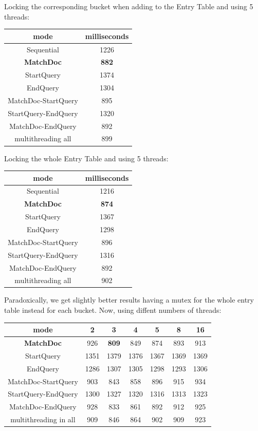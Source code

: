 \documentclass{article}
\begin{document}
Locking the corresponding bucket when adding to the Entry Table and using 5 threads:
\begin{center}
\begin{tabular}{||c c||} 
 \hline
 mode & milliseconds \\ 
 \hline\hline
 Sequential & 1226 \\
 \hline
 \textbf{MatchDoc} & \textbf{882} \\
 \hline
 StartQuery & 1374 \\
 \hline
 EndQuery & 1304 \\
 \hline
  MatchDoc-StartQuery & 895 \\
 \hline
 StartQuery-EndQuery & 1320 \\
 \hline
 MatchDoc-EndQuery & 892 \\
 \hline
 multithreading all & 899 \\
 \hline
\end{tabular}
\end{center}
Locking the whole Entry Table and using 5 threads:
\begin{center}
\begin{tabular}{||c c||} 
 \hline
 mode & milliseconds \\ 
 \hline\hline
Sequential & 1216 \\
 \hline
 \textbf{MatchDoc} & \textbf{874} \\
 \hline
 StartQuery & 1367 \\
 \hline
 EndQuery & 1298 \\
 \hline
  MatchDoc-StartQuery & 896 \\
 \hline
 StartQuery-EndQuery & 1316 \\
 \hline
 MatchDoc-EndQuery & 892 \\
 \hline
 multithreading all & 902 \\
 \hline
\end{tabular}
\end{center}
Paradoxically, we get slightly better results having a mutex for the whole entry table instead for each bucket. Now, using diffent numbers of threads: \\
\begin{center}
\begin{tabular}{||c c c c c c c||} 
 \hline
 mode & 2 & 3 & 4 & 5 & 8 & 16 \\ 
 \hline
 \hline
 \textbf{MatchDoc} & 926 & \textbf{809} & 849 & 874 & 893  & 913\\
 \hline
 StartQuery  & 1351 & 1379 & 1376 & 1367 & 1369 & 1369\\
 \hline
 EndQuery  & 1286 & 1307 & 1305 & 1298 &  1293 & 1306\\
 \hline
  MatchDoc-StartQuery  & 903 & 843 & 858 & 896 & 915 & 934\\
 \hline
 StartQuery-EndQuery & 1300 & 1327 & 1320 & 1316 & 1313 & 1323 \\
 \hline
 MatchDoc-EndQuery & 928 & 833 & 861 & 892 & 912 & 925\\
 \hline
 multithreading in all & 909 & 846 & 864 & 902 & 909 & 923\\
 \hline
\end{tabular}
\end{center}
\end{document}
